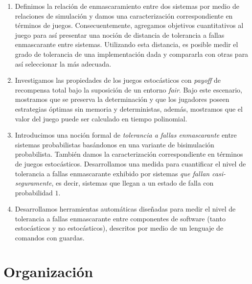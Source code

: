 \begin{enumerate}
	
\item Definimos la relación de enmascaramiento entre dos sistemas por medio de relaciones de simulación y damos una caracterización correspondiente en términos de juegos. Consecuentemente, agregamos objetivos cuantitativos al juego para así presentar una noción de distancia de tolerancia a fallas enmascarante entre sistemas. 
Utilizando esta distancia, es posible medir el grado de tolerancia de una implementación dada y compararla con otras para así seleccionar la más adecuada. 

\item Investigamos las propiedades de los juegos estocásticos con \textit{payoff} de recompensa total bajo la suposición de un entorno \textit{fair}. Bajo este escenario, mostramos que se preserva la determinación y que los jugadores poseen estrategias óptimas sin memoria y deterministas, además, mostramos que el valor del juego puede  ser calculado en tiempo polinomial.

\item Introducimos una noción formal de \textit{tolerancia a fallas enmascarante} entre sistemas probabilistas basándonos en una variante de bisimulación probabilista. También damos la caracterización correspondiente en términos de juegos estocásticos. Desarrollamos una medida para cuantificar el nivel de tolerancia a fallas enmascarante exhibido por sistemas \textit{que fallan casi-seguramente}, es decir, sistemas que llegan a un estado de falla con probabilidad $1$.

\item Desarrollamos herramientas automáticas diseñadas para medir el nivel de tolerancia a fallas enmascarante entre componentes de software (tanto estocásticos y no estocásticos), descritos por medio de un lenguaje de comandos con guardas.

 
\end{enumerate}

\section{Organización}
\label{sec:intro.organizacion}

